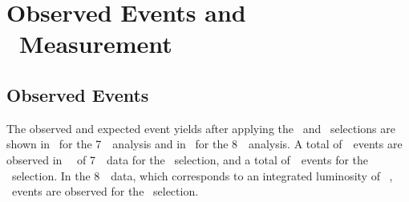 \graphicspath{{Chapters/CrossSection/Figures/}}
\chapter{Observed Events and \CX\ Measurement}
\label{chap:CrossSection}

\section{Observed Events}

The observed and expected event yields after applying the \ZZ\ and \ZZs\ selections are shown
in~ for the 7~\tev\ analysis and
in~ for the 8~\tev\ analysis. 
A total
of~\ZZSevenTeVNObsZZLLLL\ events
are observed in \LumiPassGRLTwentyEleven~\ifb\ of 7~\tev\ data for the \ZZ\
selection, and a total of~\ZZSevenTeVNObsZZsLLLL\ events for the \ZZs\ selection. In the 8~\tev\ data, which corresponds to an integrated luminosity of
\LumiPassGRLTwentyTwelve~\ifb, \ZZEightTeVNObsZZLLLL\ events are observed for
the \ZZ\ selection.

